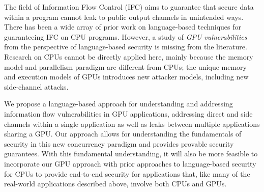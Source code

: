 The field of Information Flow Control (IFC) aims to guarantee that secure
data within a program cannot leak to public output channels in unintended
ways.
%
There has been a wide array of prior work on language-based techniques for
guaranteeing IFC on CPU programs.
%
However, a study of \emph{GPU vulnerabilities} from the perspective of language-based security is missing from the literature.
%
Research on CPUs cannot be directly applied here, mainly because the memory model and parallelism paradigm are different from CPUs; the unique memory and execution models of GPUs  introduces new attacker models, including new side-channel attacks.

%
%


%
%

%

We propose a language-based approach for understanding and addressing information flow vulnerabilities in GPU applications, addressing direct and side channels within a single application as well as leaks between multiple applications sharing a GPU.
%
Our approach allows for understanding the fundamentals of security in this new concurrency paradigm and provides provable security guarantees.
%
With this fundamental understanding, it will also be more feasible to incorporate our GPU approach with prior approaches to language-based security for CPUs to provide end-to-end security for applications that, like many of the real-world applications described above, involve both CPUs and GPUs.


